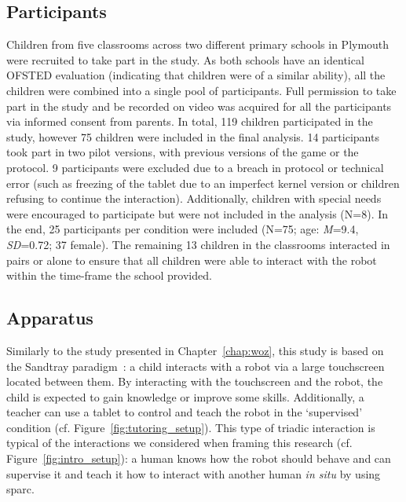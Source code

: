 \subsection{Participants}

Children from five classrooms across two different primary schools in Plymouth were recruited to take part in the study. As both schools have an identical OFSTED evaluation (indicating that children were of a similar ability), all the children were combined into a single pool of participants. Full permission to take part in the study and be recorded on video was acquired for all the participants via informed consent from parents. In total, 119 children participated in the study, however 75 children were included in the final analysis. 14 participants took part in two pilot versions, with previous versions of the game or the protocol. 9 participants were excluded due to a breach in protocol or technical error (such as freezing of the tablet due to an imperfect kernel version or children refusing to continue the interaction). Additionally, children with special needs were encouraged to participate but were not included in the analysis (N=8). In the end, 25 participants per condition were included (N=75; age: \textit{M}=9.4, \textit{SD}=0.72; 37 female). The remaining 13 children in the classrooms interacted in pairs or alone to ensure that all children were able to interact with the robot within the time-frame the school provided. 

\subsection{Apparatus}

Similarly to the study presented in Chapter~\ref{chap:woz}, this study is based on the Sandtray paradigm~\citep{baxter2012touchscreen}: a child interacts with a robot via a large touchscreen located between them. By interacting with the touchscreen and the robot, the child is expected to gain knowledge or improve some skills. Additionally, a teacher can use a tablet to control and teach the robot in the `supervised' condition (cf. Figure~\ref{fig:tutoring_setup}). This type of triadic interaction is typical of the interactions we considered when framing this research (cf. Figure~\ref{fig:intro_setup}): a human knows how the robot should behave and can supervise it and teach it how to interact with another human \textit{in situ} by using \gls{sparc}.


